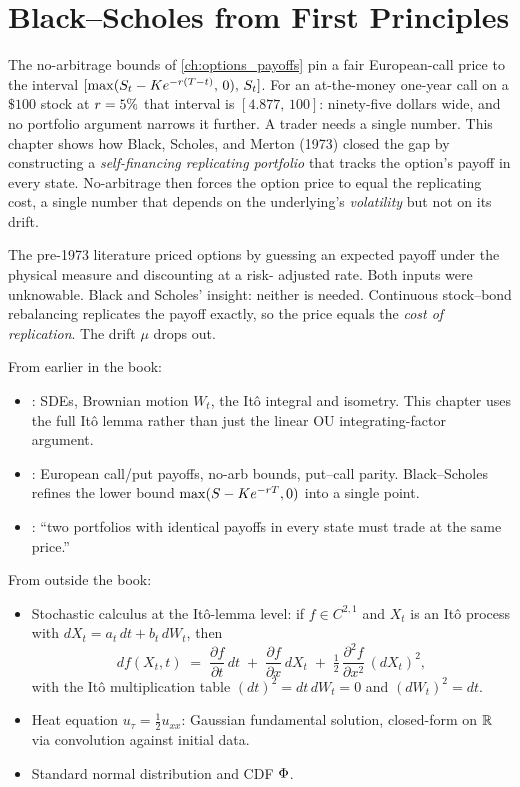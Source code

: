 \chapter{Black--Scholes from First Principles}
\label{ch:black_scholes}

The no-arbitrage bounds of \cref{ch:options_payoffs} pin a fair
European-call price to the interval
$[\max(S_t - K e^{-r(T-t)},\, 0),\,S_t]$. For
an at-the-money one-year call on a $\$100$ stock at $r = 5\%$
that interval is $[4.877,\, 100]$: ninety-five dollars wide,
and no portfolio argument narrows it further. A trader needs a
single number. This chapter shows how Black, Scholes, and Merton
(1973) closed the gap by constructing a \emph{self-financing
replicating portfolio} that tracks the option's payoff in every
state. No-arbitrage then forces the option price to equal the
replicating cost, a single number that depends on the
underlying's \emph{volatility} but not on its drift.

The pre-1973 literature priced options by guessing an expected
payoff under the physical measure and discounting at a risk-%
adjusted rate. Both inputs were unknowable. Black and Scholes'
insight: neither is needed. Continuous stock--bond rebalancing
replicates the payoff exactly, so the price equals the
\emph{cost of replication}. The drift $\mu$ drops out.

\begin{backgroundbox}[Prerequisites]
From earlier in the book:
\begin{itemize}
  \item {}: SDEs, Brownian motion
  $W_t$, the It\^o integral and isometry. This chapter uses the
  full It\^o lemma rather than just the linear OU
  integrating-factor argument.
  \item {}: European call/put payoffs,
  no-arb bounds, put--call parity. Black--Scholes refines the
  lower bound $\max(S - K e^{-rT}, 0)$ into a
  single point.
  \item {}: ``two portfolios with identical
  payoffs in every state must trade at the same price.''
\end{itemize}
From outside the book:
\begin{itemize}
  \item Stochastic calculus at the It\^o-lemma level: if
  $f \in C^{2,1}$ and $X_t$ is an It\^o process with
  $dX_t = a_t\, dt + b_t\, dW_t$, then
  \[
    df(X_t, t) \;=\; \frac{\partial f}{\partial t}\,dt
                 \;+\; \frac{\partial f}{\partial x}\,dX_t
                 \;+\; \tfrac{1}{2}\,\frac{\partial^2 f}{\partial x^2}\,
                       (dX_t)^2,
  \]
  with the It\^o multiplication table
  $(dt)^2 = dt\,dW_t = 0$ and $(dW_t)^2 = dt$.
  \item Heat equation $u_\tau = \tfrac12 u_{xx}$: Gaussian
  fundamental solution, closed-form on $\mathbb{R}$ via convolution
  against initial data.
  \item Standard normal distribution and CDF $\Phi$.
\end{itemize}
\end{backgroundbox}

